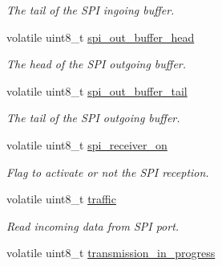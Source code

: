 \begin{DoxyCompactItemize}
\begin{DoxyCompactList}\small\item\em The tail of the S\+P\+I ingoing buffer. \end{DoxyCompactList}\item 
\hypertarget{structspi__buffer__t_aa5e0e78ee62ef739a29119e4c0f3c0b9}{volatile uint8\+\_\+t \hyperlink{structspi__buffer__t_aa5e0e78ee62ef739a29119e4c0f3c0b9}{spi\+\_\+out\+\_\+buffer\+\_\+head}}\label{structspi__buffer__t_aa5e0e78ee62ef739a29119e4c0f3c0b9}

\begin{DoxyCompactList}\small\item\em The head of the S\+P\+I outgoing buffer. \end{DoxyCompactList}\item 
\hypertarget{structspi__buffer__t_a9dd28586d7b3204220a050b545e35d88}{volatile uint8\+\_\+t \hyperlink{structspi__buffer__t_a9dd28586d7b3204220a050b545e35d88}{spi\+\_\+out\+\_\+buffer\+\_\+tail}}\label{structspi__buffer__t_a9dd28586d7b3204220a050b545e35d88}

\begin{DoxyCompactList}\small\item\em The tail of the S\+P\+I outgoing buffer. \end{DoxyCompactList}\item 
\hypertarget{structspi__buffer__t_a2d1d26f4c1d7828377e5bd120e93ad20}{volatile uint8\+\_\+t \hyperlink{structspi__buffer__t_a2d1d26f4c1d7828377e5bd120e93ad20}{spi\+\_\+receiver\+\_\+on}}\label{structspi__buffer__t_a2d1d26f4c1d7828377e5bd120e93ad20}

\begin{DoxyCompactList}\small\item\em Flag to activate or not the S\+P\+I reception. \end{DoxyCompactList}\item 
\hypertarget{structspi__buffer__t_aacf1f53fc0f38ff833996149f6e4e601}{volatile uint8\+\_\+t \hyperlink{structspi__buffer__t_aacf1f53fc0f38ff833996149f6e4e601}{traffic}}\label{structspi__buffer__t_aacf1f53fc0f38ff833996149f6e4e601}

\begin{DoxyCompactList}\small\item\em Read incoming data from S\+P\+I port. \end{DoxyCompactList}\item 
\hypertarget{structspi__buffer__t_ad0e4074a63e0751cfea8401265a28d02}{volatile uint8\+\_\+t \hyperlink{structspi__buffer__t_ad0e4074a63e0751cfea8401265a28d02}{transmission\+\_\+in\+\_\+progress}}\label{structspi__buffer__t_ad0e4074a63e0751cfea8401265a28d02}


\end{DoxyCompactItemize}
